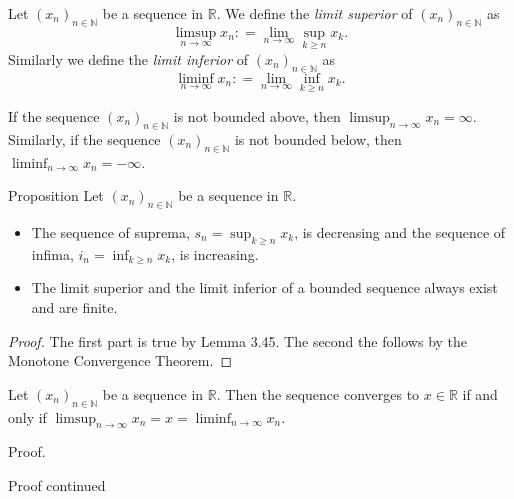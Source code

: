 \documentclass [aspectratio=169]{beamer}
\newcommand{\R}{{\mathbb{R}}}
\newcommand{\N}{{\mathbb{N}}}
\begin{document}
\begin{frame}
\begin{definition}
Let $(x_n)_{n\in \N}$ be a sequence in $\R$. We define the \emph{limit superior} of $(x_n)_{n\in \N}$ as 
$$\limsup_{n\to \infty} x_n: = \lim_{n\to \infty} \sup_{k\geq n} x_k.$$ 
Similarly we define  the \emph{limit inferior} of $(x_n)_{n\in \N}$ as 
$$\liminf_{n\to \infty} x_n: = \lim_{n\to \infty} \inf_{k\geq n} x_k.$$
\end{definition}
\vspace{1em}
If the sequence $(x_n)_{n\in \N}$ is not bounded above, then $\limsup_{n\to \infty} x_n = \infty$. Similarly, if the sequence $(x_n)_{n\in \N}$ is not bounded below, then $\liminf_{n\to \infty} x_n = -\infty$. 
\end{frame}

\begin{frame}
\begin{exampleblock}{Proposition}
Let $(x_n)_{n \in \N}$ be a sequence in $\R$.
\begin{itemize} 
\item The sequence of suprema, $s_n = \sup_{k\geq n} x_k$, is decreasing and the sequence of infima, $i_n = \inf_{k\geq n} x_k$, is increasing.
\item The limit superior and the limit inferior of a bounded sequence always exist and are finite.
\end{itemize}
\end{exampleblock}
\begin{proof}
The first part is true by Lemma 3.45. The second the follows by the Monotone Convergence Theorem.
\end{proof}

\end{frame}

\begin{frame}
\begin{theorem}
Let $(x_n)_{n\in \N}$ be a sequence in $\R$. Then the sequence converges to $x\in \R$ if and only if $\limsup_{n\to \infty} x_n= x =\liminf_{n\to \infty} x_n$.
\end{theorem}
\begin{block}{Proof.}
\vspace{4.5cm}
\end{block}
\end{frame}


\begin{frame}
\begin{block}{Proof continued}
\vspace{6.5cm}
\end{block}
\end{frame}
\end{document}
